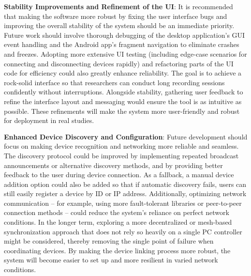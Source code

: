 \textbf{Stability Improvements and Refinement of the UI}: It is recommended that making the software more robust by fixing the user interface bugs and improving the overall stability of the system should be an immediate priority. Future work should involve thorough debugging of the desktop application's GUI event handling and the Android app's fragment navigation to eliminate crashes and freezes. Adopting more extensive UI testing (including edge-case scenarios for connecting and disconnecting devices rapidly) and refactoring parts of the UI code for efficiency could also greatly enhance reliability. The goal is to achieve a rock-solid interface so that researchers can conduct long recording sessions confidently without interruptions. Alongside stability, gathering user feedback to refine the interface layout and messaging would ensure the tool is as intuitive as possible. These refinements will make the system more user-friendly and robust for deployment in real studies.

\textbf{Enhanced Device Discovery and Configuration}: Future development should focus on making device recognition and networking more reliable and seamless. The discovery protocol could be improved by implementing repeated broadcast announcements or alternative discovery methods, and by providing better feedback to the user during device connection. As a fallback, a manual device addition option could also be added so that if automatic discovery fails, users can still easily register a device by ID or IP address. Additionally, optimizing network communication -- for example, using more fault-tolerant libraries or peer-to-peer connection methods -- could reduce the system's reliance on perfect network conditions. In the longer term, exploring a more decentralized or mesh-based synchronization approach that does not rely so heavily on a single PC controller might be considered, thereby removing the single point of failure when coordinating devices. By making the device linking process more robust, the system will become easier to set up and more resilient in varied network conditions.

